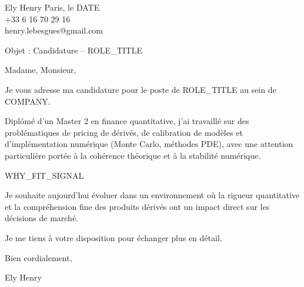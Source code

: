 \documentclass[10pt,a4paper]{article}
\begin{document}
\noindent Ely Henry \hfill Paris, le {{DATE}} \\
+33 6 16 70 29 16 \\
henry.lebesgues@gmail.com \\

\vspace{1cm}

\noindent Objet : Candidature – {{ROLE_TITLE}}

\vspace{0.5cm}

Madame, Monsieur,

\vspace{0.5cm}

Je vous adresse ma candidature pour le poste de {{ROLE_TITLE}} au sein de {{COMPANY}}.

Diplômé d’un Master 2 en finance quantitative, j’ai travaillé sur des problématiques de pricing de dérivés, de calibration de modèles et d’implémentation numérique (Monte Carlo, méthodes PDE), avec une attention particulière portée à la cohérence théorique et à la stabilité numérique.

{{WHY_FIT_SIGNAL}}

Je souhaite aujourd’hui évoluer dans un environnement où la rigueur quantitative et la compréhension fine des produits dérivés ont un impact direct sur les décisions de marché.

Je me tiens à votre disposition pour échanger plus en détail.

Bien cordialement,

\vspace{1cm}

\noindent Ely Henry
\end{document}
